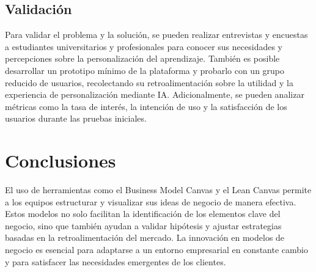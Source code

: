 \documentclass[a4paper,10pt]{article}
\begin{document}
\begin{center}
\end{center}

\subsection{Validación}

Para validar el problema y la solución, se pueden realizar entrevistas y encuestas a estudiantes universitarios y profesionales para conocer sus necesidades y percepciones sobre la personalización del aprendizaje. También es posible desarrollar un prototipo mínimo de la plataforma y probarlo con un grupo reducido de usuarios, recolectando su retroalimentación sobre la utilidad y la experiencia de personalización mediante IA. Adicionalmente, se pueden analizar métricas como la tasa de interés, la intención de uso y la satisfacción de los usuarios durante las pruebas iniciales.
\section*{Conclusiones}
El uso de herramientas como el Business Model Canvas y el Lean Canvas permite a los equipos estructurar
y visualizar sus ideas de negocio de manera efectiva. Estos modelos no solo facilitan la identificación de los elementos clave del negocio, sino que también ayudan a validar hipótesis y ajustar estrategias basadas en la retroalimentación del mercado. La innovación en modelos de negocio es esencial para adaptarse a un entorno empresarial en constante cambio y para satisfacer las necesidades emergentes de los clientes.
\end{document}
